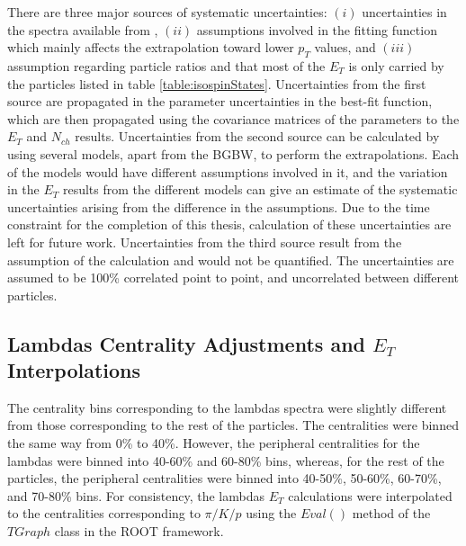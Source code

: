 There are three major sources of systematic uncertainties: $(i)$ uncertainties in the spectra available from \cite{PhysRevC.96.044904}, $(ii)$ assumptions involved in the fitting function which mainly affects the extrapolation toward lower $p_{T}$ values, and $(iii)$ assumption regarding particle ratios and that most of the $E_{T}$ is only carried by the particles listed in table \ref{table:isospinStates}. Uncertainties from the first source are propagated in the parameter uncertainties in the best-fit function, which are then propagated using the covariance matrices of the parameters to the $E_{T}$ and $N_{ch}$ results. Uncertainties from the second source can be calculated by using several models, apart from the BGBW, to perform the extrapolations. Each of the models would have different assumptions involved in it, and the variation in the $E_{T}$ results from the different models can give an estimate of the systematic uncertainties arising from the difference in the assumptions. Due to the time constraint for the completion of this thesis, calculation of these uncertainties are left for future work. Uncertainties from the third source result from the assumption of the calculation and would not be quantified. The uncertainties are assumed to be 100\% correlated point to point, and uncorrelated between different particles.
 
\subsection{Lambdas Centrality Adjustments and $E_{T}$ Interpolations}
The centrality bins corresponding to the lambdas spectra were slightly different from those corresponding to the rest of the particles. The centralities were binned the same way from 0\% to 40\%. However, the peripheral centralities for the lambdas were binned into 40-60\% and 60-80\% bins, whereas, for the rest of the particles, the peripheral centralities were binned into 40-50\%, 50-60\%, 60-70\%, and 70-80\% bins. For consistency, the lambdas $E_{T}$ calculations were interpolated to the centralities corresponding to $\pi/K/p$ using the $Eval()$ method of the $TGraph$ class in the ROOT framework.
